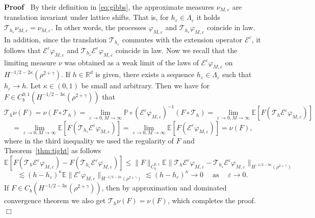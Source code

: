 \documentclass[a4paper,11pt]{article}
\newcommand{\tmop}[1]{\ensuremath{\operatorname{#1}}}
\newenvironment{proof}{\noindent\textbf{Proof\ }}{\hspace*{\fill}$\Box$\medskip}
\numberwithin{equation}{section}
\begin{document}
\begin{proof}
  By their definition in {\eqref{eq:gibbs}}, the approximate
  measures $\nu_{M, \varepsilon}$ are translation invariant under lattice
  shifts. That is, for $h_{\varepsilon} \in \Lambda_{\varepsilon}$ it holds
  $\mathcal{T}_{h_{\varepsilon}} \nu_{M, \varepsilon} = \nu_{M, \varepsilon}$.
  In other words, the processes $\varphi_{M, \varepsilon}$ and
  $\mathcal{T}_{h_{\varepsilon}} \varphi_{M, \varepsilon}$ coincide in law. In
  addition, since the translation $\mathcal{T}_{h_{\varepsilon}}$ commutes
  with the extension operator $\mathcal{E}^{\varepsilon}$, it follows that
  $\mathcal{E}^{\varepsilon} \varphi_{M, \varepsilon}$ and
  $\mathcal{T}_{h_{\varepsilon}} \mathcal{E}^{\varepsilon} \varphi_{M,
  \varepsilon}$ coincide in law. Now we recall that the limiting measure $\nu$
  was obtained as a weak limit of the laws of $\mathcal{E}^{\varepsilon}
  \varphi_{M, \varepsilon}$ on $H^{- 1 / 2 - 2\kappa} (\rho^{2 + \gamma})$. If
  $h \in \mathbb{R}^d$ is given, there exists a sequence $h_{\varepsilon} \in
  \Lambda_{\varepsilon}$ such that $h_{\varepsilon} \rightarrow h$. Let
  $\kappa \in (0, 1)$ be small and arbitrary. Then we have for $F \in C^{0,
  1}_b (H^{- 1 / 2 - 3 \kappa} (\rho^{2 + \gamma}))$ that
  \[ \mathcal{T}_h \nu (F) = \nu (F \circ \mathcal{T}_h) = \lim_{\varepsilon
     \rightarrow 0, M \rightarrow \infty} \mathbb{P} \circ
     (\mathcal{E}^{\varepsilon} \varphi_{M, \varepsilon})^{- 1} (F \circ
     \mathcal{T}_h) = \lim_{\varepsilon \rightarrow 0, M \rightarrow \infty}
     \mathbb{E} [F (\mathcal{T}_h \mathcal{E}^{\varepsilon} \varphi_{M,
     \varepsilon})] \]
  \[ \  \]
  \[ = \lim_{\varepsilon \rightarrow 0, M \rightarrow \infty} \mathbb{E} [F
     (\mathcal{T}_{h_{\varepsilon}} \mathcal{E}^{\varepsilon} \varphi_{M,
     \varepsilon})] = \lim_{\varepsilon \rightarrow 0, M \rightarrow \infty}
     \mathbb{E} [F (\mathcal{E}^{\varepsilon} \varphi_{M, \varepsilon})] = \nu
     (F), \]
  where in the third inequality we used the regularity of $F$ and Theorem~\ref{thm:tight} as follows
  \[ \mathbb{E} [F (\mathcal{T}_h \mathcal{E}^{\varepsilon} \varphi_{M,
     \varepsilon}) - F (\mathcal{T}_{h_{\varepsilon}}
     \mathcal{E}^{\varepsilon} \varphi_{M, \varepsilon})] \leqslant \| F
     \|_{C^{0, 1}_b} \mathbb{E} \| \mathcal{T}_h \mathcal{E}^{\varepsilon}
     \varphi_{M, \varepsilon} - \mathcal{T}_{h_{\varepsilon}}
     \mathcal{E}^{\varepsilon} \varphi_{M, \varepsilon} \|_{H^{- 1 / 2 - 3
     \kappa} (\rho^{2 + \gamma})} \]
  \[ \lesssim (h - h_{\varepsilon})^{\kappa} \mathbb{E} \|
     \mathcal{E}^{\varepsilon} \varphi_{M, \varepsilon} \|_{H^{- 1 / 2 -
     2\kappa} (\rho^{2 + \gamma})} \lesssim (h - h_{\varepsilon})^{\kappa}
     \rightarrow 0 \quad \tmop{as} \quad \varepsilon \rightarrow 0. \]
  If $F \in C_b (H^{- 1 / 2 - 3 \kappa} (\rho^{2 + \gamma}))$, then by
  approximation and dominated convergence theorem we also get $\mathcal{T}_h
  \nu (F) = \nu (F)$, which completes the proof.
\end{proof}
\end{document}
